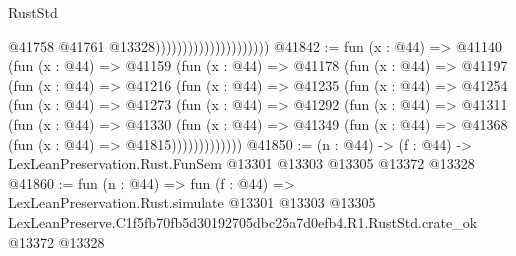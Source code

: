 \begin{lexlean}{RustStd}
\begin{coremodule}
                                              @41758
                                              @41761
                                              @13328)))))))))))))))))))))
@41842 := fun (x : @44) =>
  @41140
    (fun (x : @44) =>
    @41159
      (fun (x : @44) =>
      @41178
        (fun (x : @44) =>
        @41197
          (fun (x : @44) =>
          @41216
            (fun (x : @44) =>
            @41235
              (fun (x : @44) =>
              @41254
                (fun (x : @44) =>
                @41273
                  (fun (x : @44) =>
                  @41292
                    (fun (x : @44) =>
                    @41311
                      (fun (x : @44) =>
                      @41330
                        (fun (x : @44) =>
                        @41349 (fun (x : @44) => @41368 (fun (x : @44) => @41815)))))))))))))
@41850 := (n : @44) ->
  (f : @44) -> LexLeanPreservation.Rust.FunSem @13301 @13303 @13305 @13372 @13328
@41860 := fun (n : @44) =>
  fun (f : @44) =>
  LexLeanPreservation.Rust.simulate
    @13301
    @13303
    @13305
    LexLeanPreserve.C1f5fb70fb5d30192705dbc25a7d0efb4.R1.RustStd.crate_ok
    @13372
    @13328
\end{coremodule}
\end{lexlean}
